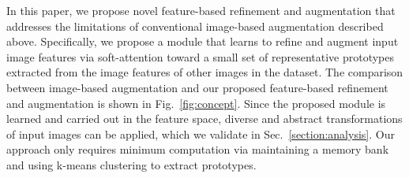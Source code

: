 \documentclass[runningheads]{llncs}
\begin{document}
In this paper, we propose novel feature-based refinement and augmentation that addresses the limitations of conventional image-based augmentation described above.
Specifically, we propose a module that learns to refine and augment input image features via soft-attention toward a small set of representative prototypes extracted from the image features of other images in the dataset.
The comparison between image-based augmentation and our proposed feature-based refinement and augmentation is shown in Fig.~\ref{fig:concept}.
Since the proposed module is learned and carried out in the feature space, diverse and abstract transformations of input images can be applied, which we validate in Sec.~\ref{section:analysis}.
Our approach only requires minimum computation via maintaining a memory bank and using k-means clustering to extract prototypes.
\end{document}
